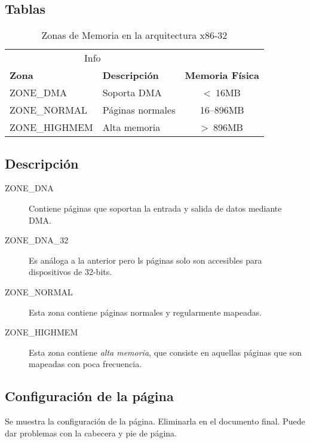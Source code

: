 \documentclass{article}
\theoremstyle{theorem-style}  %
\theoremstyle{definition}
\theoremstyle{example-style}
\begin{document}
    \subsection{Tablas}
    
        \lipsum[1]
        
        \begin{table}[ht]
            \caption{Zonas de Memoria en la arquitectura x86-32}
            \kern 1mm                                  %
            \centering 
            \begin{tabular}{@{}llc@{}}
                \toprule
                \multicolumn{2}{c}{Info}                                            \\
                \cmidrule(r){1-2}
                \textbf{Zona} & \textbf{Descripción}   & \textbf{Memoria Física}    \\ 
                \midrule
                ZONE\_DMA     & Soporta DMA            & \textless \ 16MB           \\ 
                ZONE\_NORMAL  & Páginas normales       & 16–896MB                   \\
                ZONE\_HIGHMEM & Alta memoria           & \textgreater \ 896MB       \\ 
                \bottomrule
            \end{tabular}
            \label{table:memoria-x86-32}
        \end{table}
    
    \subsection{Descripción}
    
        \begin{description}
            \item[ZONE\_DNA] Contiene páginas que soportan la entrada y salida de datos mediante DMA.
            \item[ZONE\_DNA\_32] Es análoga a la anterior pero ls páginas solo son accesibles para
            dispositivos de 32-bits.
            \item[ZONE\_NORMAL] Esta zona contiene páginas normales y regularmente mapeadas.
            \item[ZONE\_HIGHMEM] Esta zona contiene \textit{alta memoria}, que consiste en
             aquellas páginas que son mapeadas con poca frecuencia.
        \end{description}
        
    \pagebreak
    
    \subsection{Configuración de la página}
        Se muestra la configuración de la página. Eliminarla en el documento final. 
        Puede dar problemas con la cabecera y pie de página.
        
        \centering\layout
    
\end{document}
